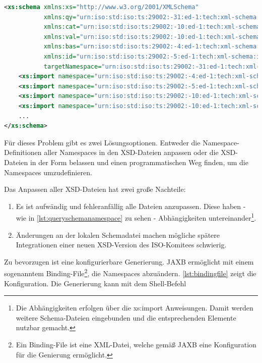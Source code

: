 \begin{lstlisting}[caption=query.xsd Namespace Definitionen, language=XML, label=lst:queryschemanamespace]
<xs:schema xmlns:xs="http://www.w3.org/2001/XMLSchema"
           xmlns:qy="urn:iso:std:iso:ts:29002:-31:ed-1:tech:xml-schema:query"
           xmlns:cat="urn:iso:std:iso:ts:29002:-10:ed-1:tech:xml-schema:catalogue"
           xmlns:val="urn:iso:std:iso:ts:29002:-10:ed-1:tech:xml-schema:value"
           xmlns:bas="urn:iso:std:iso:ts:29002:-4:ed-1:tech:xml-schema:basic"
           xmlns:id="urn:iso:std:iso:ts:29002:-5:ed-1:tech:xml-schema:identifier"
           targetNamespace="urn:iso:std:iso:ts:29002:-31:ed-1:tech:xml-schema:query" elementFormDefault="qualified">
    <xs:import namespace="urn:iso:std:iso:ts:29002:-4:ed-1:tech:xml-schema:basic" schemaLocation="basic.xsd"/>
    <xs:import namespace="urn:iso:std:iso:ts:29002:-5:ed-1:tech:xml-schema:identifier" schemaLocation="identifier.xsd"/>
    <xs:import namespace="urn:iso:std:iso:ts:29002:-10:ed-1:tech:xml-schema:catalogue" schemaLocation="catalogue.xsd"/>
    <xs:import namespace="urn:iso:std:iso:ts:29002:-10:ed-1:tech:xml-schema:value" schemaLocation="value.xsd"/>
    ...
</xs:schema>    
\end{lstlisting}

Für dieses Problem gibt es zwei Lösungsoptionen. Entweder die \gls{Namespace}-Definitionen aller \Glspl{Namespace} in den XSD-Dateien anpassen oder die XSD-Dateien in der Form belassen und einen programmatischen Weg finden, um die \Glspl{Namespace} umzudefinieren. 

Das Anpassen aller XSD-Dateien hat zwei große Nachteile:
\begin{enumerate}
\item Es ist aufwändig und fehleranfällig alle Dateien anzupassen. Diese haben - wie in \autoref{lst:queryschemanamespace} zu sehen - Abhängigkeiten untereinander\footnote{Die Abhängigkeiten erfolgen über die xs:import Anweisungen. Damit werden weitere Schema-Dateien eingebunden und die entsprechenden Elemente nutzbar gemacht.}.
\item Änderungen an der lokalen Schemadatei machen mögliche spätere Integrationen einer neuen XSD-Version des ISO-Komitees schwierig.
\end{enumerate}

Zu bevorzugen ist eine konfigurierbare Generierung. \gls{JAXB} ermöglicht mit einem sogenanntem Binding-File\footnote{Ein Binding-File ist eine XML-Datei, welche gemäß JAXB eine Konfiguration für die Genierung ermöglicht.}, die \Glspl{Namespace} abzuändern. \autoref{lst:bindingfile} zeigt die Konfiguration. Die Generierung kann mit dem Shell-Befehl 

